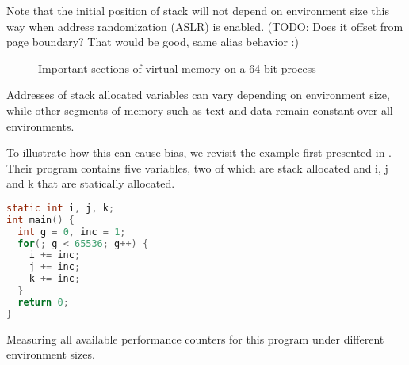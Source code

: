 \documentclass[a4paper,11pt,twocolumn,twoside]{article}
\begin{document}
Note that the initial position of stack will not depend on environment size this way when address randomization (ASLR) is enabled. (TODO: Does it offset from page boundary? That would be good, same alias behavior :)

\begin{figure}
  \caption{Important sections of virtual memory on a 64 bit process}
  \label{fig:stack}
\end{figure}

Addresses of stack allocated variables can vary depending on environment size, while other segments of memory such as text and data remain constant over all environments.

To illustrate how this can cause bias, we revisit the example first presented in \cite{Mytkowicz:2009:WrongData}.
Their program contains five variables, two of which are stack allocated and i, j and k that are statically allocated.

\begin{lstlisting}[language=C]
static int i, j, k;
int main() {
  int g = 0, inc = 1;
  for(; g < 65536; g++) {
    i += inc;
    j += inc;
    k += inc; 
  }
  return 0;
}
\end{lstlisting}

Measuring all available performance counters for this program under different environment sizes.
\end{document}

